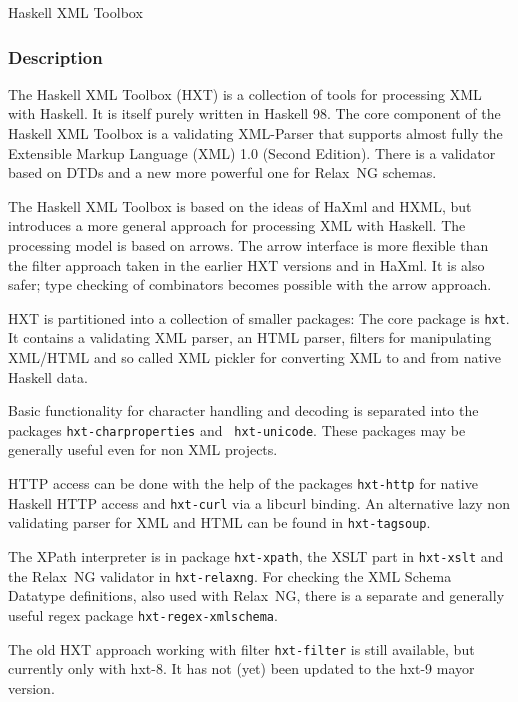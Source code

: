 \begin{hcarentry}[updated]{Haskell XML Toolbox}
\label{hxt}
\makeheader

\subsubsection*{Description}

The Haskell XML Toolbox (HXT) is a collection of tools for processing XML with
Haskell. It is itself purely written in Haskell 98. The core component of the
Haskell XML Toolbox is a validating XML-Parser that supports
almost fully the Extensible Markup Language (XML) 1.0 (Second Edition).
There is a validator based on DTDs and a new more powerful one for
Relax~NG schemas.

The Haskell XML Toolbox is based on the ideas of HaXml %
and HXML,
but introduces a more general approach for processing XML with Haskell.
The processing model is based on arrows. The arrow interface is more flexible
than the filter approach taken in the earlier HXT versions and in HaXml.
It is also safer; type checking of combinators becomes possible with the arrow
approach.

HXT is partitioned into a collection of smaller packages: The core
package is
{\tt hxt}. It contains a validating XML parser, an HTML parser,
filters for manipulating XML/HTML and so called XML pickler for
converting XML to and from native Haskell data.

Basic functionality for character handling and decoding is
separated into the packages {\tt hxt-charproperties} and {\tt
 hxt-unicode}. These packages may be generally useful even for non XML projects.

HTTP access can be done with the help of the packages
{\tt hxt-http} for native Haskell HTTP access and {\tt hxt-curl} via a
libcurl binding. An alternative lazy non validating parser for XML and HTML can be
found in {\tt hxt-tagsoup}. 

The XPath interpreter is in package {\tt hxt-xpath}, the XSLT part in
{\tt hxt-xslt}
and the Relax~NG validator in {\tt hxt-relaxng}. For checking the XML
Schema Datatype definitions, also used with Relax~NG, there is a
separate and generally useful regex package {\tt hxt-regex-xmlschema}.

The old HXT approach working with filter {\tt hxt-filter} is still
available,
but currently only with hxt-8. It has not (yet) been updated to the
hxt-9 mayor version.


\end{hcarentry}
